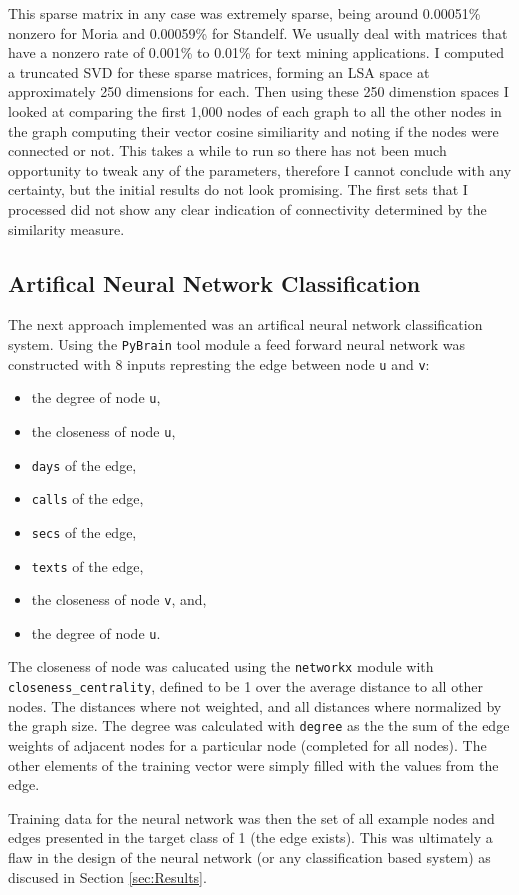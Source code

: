 This sparse matrix in any case was extremely sparse, being around 0.00051\%
nonzero for Moria and 0.00059\% for Standelf.  We usually deal with matrices
that have a nonzero rate of 0.001\% to 0.01\% for text mining applications.  I
computed a truncated SVD for these sparse matrices, forming an LSA space at
approximately 250 dimensions for each.  Then using these 250 dimenstion spaces
I looked at comparing the first 1,000 nodes of each graph to all the other
nodes in the graph computing their vector cosine similiarity and noting if the
nodes were connected or not.  This takes a while to run so there has not been
much opportunity to tweak any of the parameters, therefore I cannot conclude
with any certainty, but the initial results do not look promising.  The first
sets that I  processed did not show any clear indication of connectivity
determined by the similarity measure.

\subsection{Artifical Neural Network Classification}
The next approach implemented was an artifical neural network classification system.
Using the \verb+PyBrain+ tool module a feed forward neural network was constructed with 8 inputs represting the edge between node \texttt{u} and \texttt{v}:
\begin{itemize}
	\item the degree of node \texttt{u},
	\item the closeness of node \texttt{u},
	\item \texttt{days} of the edge,
	\item \texttt{calls} of the edge,
	\item \texttt{secs} of the edge,
	\item \texttt{texts} of the edge,
	\item the closeness of node \texttt{v}, and,
	\item the degree of node \texttt{u}.
\end{itemize}
The closeness of node was calucated using the \verb+networkx+ module with \verb+closeness_centrality+, defined to be 1 over the average distance to all other nodes. The distances where not weighted, and all distances where normalized by the graph size.
The degree was calculated with \verb+degree+ as the the sum of the edge weights of adjacent nodes for a particular node (completed for all nodes).
The other elements of the training vector were simply filled with the values from the edge.

Training data for the neural network was then the set of all example nodes and edges presented in the target class of 1 (the edge exists). This was ultimately a flaw in the design of the neural network (or any classification based system) as discused in Section \ref{sec:Results}.

